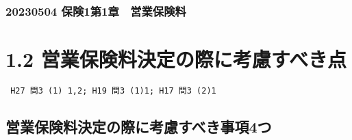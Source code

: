 \documentclass[
]{article}
\author{}
\date{}
\begin{document}
\hypertarget{ux4fddux967a1ux7b2c1ux7ae0-ux55b6ux696dux4fddux967aux6599}{%
\subsubsection{20230504
保険1第1章　営業保険料}\label{ux4fddux967a1ux7b2c1ux7ae0-ux55b6ux696dux4fddux967aux6599}}

\hypertarget{ux55b6ux696dux4fddux967aux6599ux6c7aux5b9aux306eux969bux306bux8003ux616eux3059ux3079ux304dux70b9}{%
\section{1.2
営業保険料決定の際に考慮すべき点}\label{ux55b6ux696dux4fddux967aux6599ux6c7aux5b9aux306eux969bux306bux8003ux616eux3059ux3079ux304dux70b9}}

\begin{verbatim}
 H27 問3 (1) 1,2; H19 問3 (1)1; H17 問3 (2)1
\end{verbatim}

\hypertarget{ux55b6ux696dux4fddux967aux6599ux6c7aux5b9aux306eux969bux306bux8003ux616eux3059ux3079ux304dux4e8bux98054ux3064}{%
\subsection{営業保険料決定の際に考慮すべき事項4つ}\label{ux55b6ux696dux4fddux967aux6599ux6c7aux5b9aux306eux969bux306bux8003ux616eux3059ux3079ux304dux4e8bux98054ux3064}}
\end{document}
